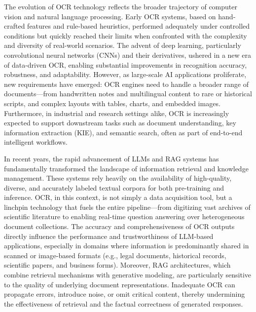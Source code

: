 \documentclass[11pt, a4paper, logo, copyright, nonumbering]{paddleocr}
\begin{document}
The evolution of OCR technology reflects the broader trajectory of computer vision and natural language processing. Early OCR systems\citep{mori1999ocr,506792}, based on hand-crafted features and rule-based heuristics, performed adequately under controlled conditions but quickly reached their limits when confronted with the complexity and diversity of real-world scenarios. The advent of deep learning, particularly convolutional neural networks (CNNs) and their derivatives, ushered in a new era of data-driven OCR, enabling substantial improvements in recognition accuracy, robustness, and adaptability\citep{goodfellow2014multidigitnumberrecognitionstreet,shi2015endtoendtrainableneuralnetwork}. However, as large-scale AI applications proliferate, new requirements have emerged: OCR engines need to handle a broader range of documents---from handwritten notes and multilingual content to rare or historical scripts, and complex layouts with tables, charts, and embedded images. Furthermore, in industrial and research settings alike, OCR is increasingly expected to support downstream tasks such as document understanding, key information extraction (KIE), and semantic search, often as part of end-to-end intelligent workflows.

In recent years, the rapid advancement of LLMs and RAG systems has fundamentally transformed the landscape of information retrieval and knowledge management. These systems rely heavily on the availability of high-quality, diverse, and accurately labeled textual corpora for both pre-training and inference. OCR, in this context, is not simply a data acquisition tool, but a linchpin technology that fuels the entire pipeline---from digitizing vast archives of scientific literature to enabling real-time question answering over heterogeneous document collections. The accuracy and comprehensiveness of OCR outputs directly influence the performance and trustworthiness of LLM-based applications, especially in domains where information is predominantly shared in scanned or image-based formats (e.g., legal documents, historical records, scientific papers, and business forms). Moreover, RAG architectures, which combine retrieval mechanisms with generative modeling, are particularly sensitive to the quality of underlying document representations. Inadequate OCR can propagate errors, introduce noise, or omit critical content, thereby undermining the effectiveness of retrieval and the factual correctness of generated responses.
\end{document}
